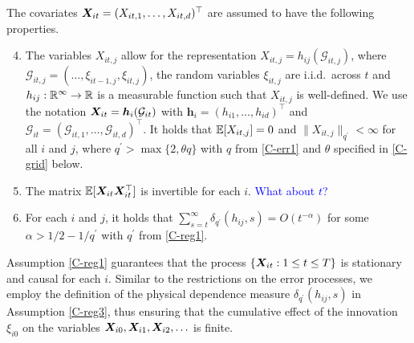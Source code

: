 \documentclass[a4paper,12pt]{article}
\begin{document}
The covariates $\boldsymbol{X}_{it} = (X_{it,1},\ldots, X_{it, d})^\top$ are assumed to have the following properties. 
\begin{enumerate}[label=(C\arabic*),leftmargin=1.05cm]
\setcounter{enumi}{3}
\item \label{C-reg1} The variables $X_{it, j}$ allow for the representation $X_{it, j} = h_{ij}(\mathcal{G}_{it, j})$, where $\mathcal{G}_{it, j} = (\ldots, \xi_{it-1,j}, \xi_{it, j})$, the random variables $\xi_{it, j}$ are i.i.d.\ across $t$ and $h_{ij}: \mathbb{R}^\infty \rightarrow \mathbb{R}$ is a measurable function such that $X_{it, j}$ is well-defined. We use the notation $\boldsymbol{X}_{it} = \boldsymbol{h}_{i}(\mathcal{G}_{it})$ with $\boldsymbol{h}_i = (h_{i1}, \ldots, h_{id})^\top$ and $\mathcal{G}_{it} = (\mathcal{G}_{it,1}, \ldots, \mathcal{G}_{it, d})^\top$. It holds that $\mathbb{E} [X_{it, j}]=0$ and $\| X_{it, j} \|_{q^\prime} <\infty$ for all $i$ and $j$, where $q^\prime > \max \{ 2, \theta q \}$ with $q$ from \ref{C-err1} and $\theta$ specified in \ref{C-grid} below.
\item \label{C-reg2} The matrix $\mathbb{E}[\boldsymbol{X}_{it} \boldsymbol{X}_{it}^\top]$ is invertible for each $i$. \textcolor{blue}{What about $t$?}
\item \label{C-reg3} For each $i$ and $j$, it holds that $\sum_{s=t}^{\infty} \delta_{q^\prime}(h_{ij}, s)= O(t^{-\alpha})$ for some $\alpha > 1/2 - 1/{q^\prime}$ with $q^\prime$ from \ref{C-reg1}.
\end{enumerate}
Assumption \ref{C-reg1} guarantees that the process $\{ \boldsymbol{X}_{it}: 1 \le t \le T \}$ is stationary and causal for each $i$. Similar to the restrictions on the error processes, we employ the definition of the physical dependence measure $\delta_{q^\prime}(h_{ij}, s)$ in Assumption \ref{C-reg3}, thus ensuring that the cumulative effect of the innovation $\xi_{i0}$ on the variables $\boldsymbol{X}_{i0}, \boldsymbol{X}_{i1}, \boldsymbol{X}_{i2},\ldots$ is finite. 
\end{document}
